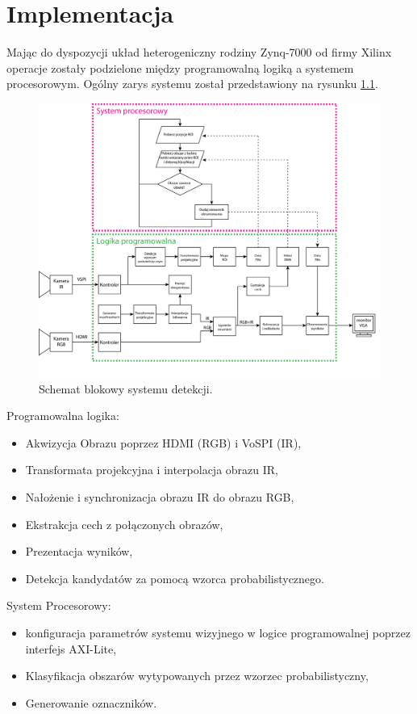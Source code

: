 \chapter{Implementacja}
\label{cha:impl}

Mając do dyspozycji układ heterogeniczny rodziny Zynq-7000 od firmy Xilinx operacje zostały podzielone między programowalną logiką a systemem procesorowym. Ogólny zarys systemu został przedstawiony na rysunku \ref{fig:systemwizyjny}.

\begin{figure}[h]
    \centering
    \includegraphics[width=1\textwidth]{images/system}
    \caption{Schemat blokowy systemu detekcji.}
    \label{fig:systemwizyjny}
\end{figure}

Programowalna logika:
\begin{itemize}
\item Akwizycja Obrazu poprzez HDMI (RGB) i VoSPI (IR),
\item Transformata projekcyjna i interpolacja obrazu IR,
\item Nałożenie i synchronizacja obrazu IR do obrazu RGB,
\item Ekstrakcja cech z połączonych obrazów,
\item Prezentacja wyników,
\item Detekcja kandydatów za pomocą wzorca probabilistycznego.
\end{itemize}
System Procesorowy:
\begin{itemize}
\item konfiguracja parametrów systemu wizyjnego w logice programowalnej poprzez interfejs AXI-Lite,
\item Klasyfikacja obszarów wytypowanych przez wzorzec probabilistyczny,
\item Generowanie oznaczników.
\end{itemize}

